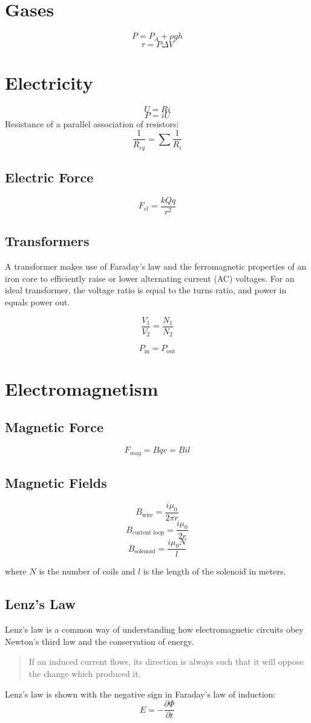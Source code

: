 \documentclass[oneside]{book}
\newcommand*\reciprocal[1]{\frac{1}{#1}}
\begin{document}
\chapter{Gases}
\[P = P_A + \rho g h\]
\[\tau = P \Delta V\]

\chapter{Electricity}
\[U = R i\]
\[P = i U\]
Resistance of a parallel association of resistors:
\[\reciprocal{R_{eq}} = \sum{\reciprocal{R_i}}\]

\section{Electric Force}
\[F_{el} = \frac{k Q q}{r^2}\]

\section{Transformers}
A transformer makes use of Faraday's law and the ferromagnetic properties of an
iron core to efficiently raise or lower alternating current (AC) voltages.
For an ideal transformer, the voltage ratio is equal to the turns ratio, and
power in equals power out.

\[\frac{V_1}{V_2} = \frac{N_1}{N_2}\]

\[P_{\text{in}} = P_{\text{out}}\]

\chapter{Electromagnetism}

\section{Magnetic Force}
\[F_{mag} = B q v = B i l\]

\section{Magnetic Fields}
\[B_{\text{wire}} = \frac{i \mu_0}{2 \pi r}\]
\[B_{\text{current loop}} = \frac{i \mu_0}{2 r}\]
\[B_{\text{solenoid}} = \frac{i \mu_0 N}{l}\]

where \(N\) is the number of coils and \(l\) is the length of the solenoid in
meters.

\section{Lenz's Law}
Lenz's law is a common way of understanding how electromagnetic circuits obey
Newton's third law and the conservation of energy.
\begin{quote}
If an induced current flows, its direction is always such that it will oppose
the change which produced it.
\end{quote}
Lenz's law is shown with the negative sign in Faraday's law of induction:
\[{E}=-\frac{\partial \Phi}{\partial t}\]
\end{document}
